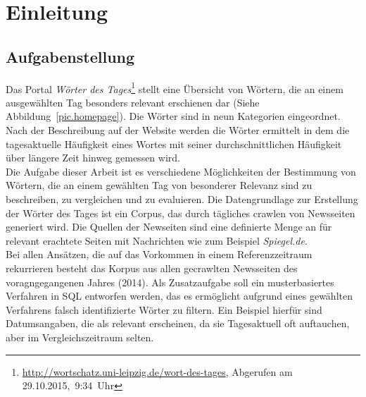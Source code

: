 


\ourtitlepage 
\tableofcontents
{} %
\clearpage
{} %



\chapter{Einleitung}

\section{Aufgabenstellung}
Das Portal  \emph{Wörter des Tages}\footnote{\url{http://wortschatz.uni-leipzig.de/wort-des-tages}, Abgerufen am 29.10.2015,~9:34~Uhr} stellt eine Übersicht von Wörtern, die an einem ausgewählten Tag besonders relevant erschienen dar (Siehe Abbildung~\ref{pic.homepage}). Die Wörter sind in neun Kategorien eingeordnet. Nach der Beschreibung auf der Website werden die Wörter ermittelt in dem die tagesaktuelle Häufigkeit eines Wortes mit seiner durchschnittlichen Häufigkeit über längere Zeit hinweg gemessen wird.\\
Die Aufgabe dieser Arbeit ist es verschiedene Möglichkeiten der Bestimmung von Wörtern, die an einem gewählten Tag von besonderer Relevanz sind zu beschreiben, zu vergleichen und zu evaluieren. 
Die Datengrundlage zur Erstellung der Wörter des Tages ist ein Corpus, das durch tägliches crawlen von Newsseiten generiert wird. Die Quellen der Newseiten sind eine definierte Menge an für relevant erachtete Seiten mit Nachrichten wie zum Beispiel \emph{Spiegel.de}.\\
Bei allen Ansätzen, die auf das Vorkommen in einem Referenzzeitraum rekurrieren besteht das Korpus aus allen gecrawlten Newsseiten des voragngegangenen Jahres (2014).
Als Zusatzaufgabe soll ein musterbasiertes Verfahren in SQL entworfen werden, das es ermöglicht aufgrund eines gewählten Verfahrens falsch identifizierte Wörter zu filtern. Ein Beispiel hierfür sind Datumsangaben, die als relevant erscheinen, da sie Tagesaktuell oft auftauchen, aber im Vergleichszeitraum selten.

